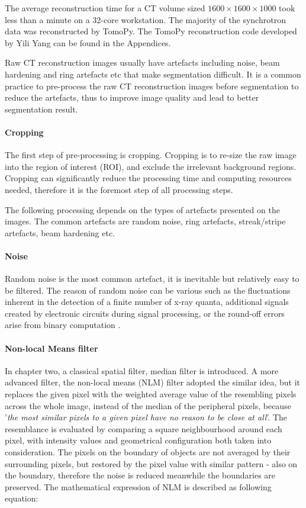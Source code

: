 The average reconstruction time for a CT volume sized $1600 \times 1600 \times 1000$ took less than a minute on a 32-core workstation. The majority of the synchrotron data was reconstructed by TomoPy. The TomoPy reconstruction code developed by Yili Yang can be found in the Appendices.

Raw CT reconstruction images usually have artefacts including noise, beam hardening and ring artefacts etc that make segmentation difficult. It is a common practice to pre-process the raw CT reconstruction images before segmentation to reduce the artefacts, thus to improve image quality and lead to better segmentation result. 

\paragraph{Cropping} The first step of pre-processing is cropping. Cropping is to re-size the raw image into the region of interest (ROI), and exclude the irrelevant background regions. Cropping can significantly reduce the processing time and computing resources needed, therefore it is the foremost step of all processing steps.

The following processing depends on the types of artefacts presented on the images. The common artefacts are random noise, ring artefacts, streak/stripe artefacts, beam hardening etc.

\paragraph{Noise} Random noise is the most common artefact, it is inevitable but relatively easy to be filtered. The reason of random noise can be various such as the fluctuations inherent in the detection of a finite number of x-ray quanta, additional signals created by electronic circuits during signal processing, or the round-off errors arise from binary computation \citep{hanson1981radiology}.

\paragraph{Non-local Means filter} 
In chapter two, a classical spatial filter, median filter is introduced. A more advanced filter, the non-local means (NLM) filter \citep{buades2011non} adopted the similar idea, but it replaces the given pixel with the weighted average value of the resembling pixels across the whole image, instead of the median of the peripheral pixels, because '\textit{the most similar pixels to a given pixel have no reason to be close at all}'. The resemblance is evaluated by comparing a square neighbourhood around each pixel, with intensity values and geometrical configuration both taken into consideration. The pixels on the boundary of objects are not averaged by their surrounding pixels, but restored by the pixel value with similar pattern - also on the boundary, therefore the noise is reduced meanwhile the boundaries are preserved. The mathematical expression of NLM is described as following equation:


